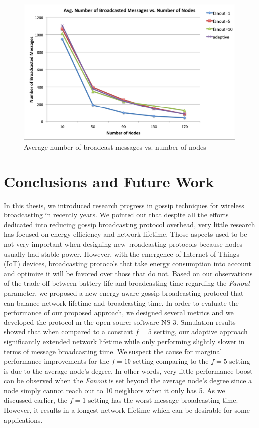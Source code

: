 \documentclass[onehalf,11pt]{beavtex}
\begin{document}
\begin{figure} 
	\centering
	\includegraphics[width=5.5in]{brNum.png}
	\caption{Average number of broadcast messages vs. number of nodes}
	\label{fig:brNum}
\end{figure}

\chapter{Conclusions and Future Work}
\label{Chapter6}

In this thesis, we introduced research progress in gossip techniques for wireless broadcasting in recently years. We pointed out that despite all the efforts dedicated into reducing gossip broadcasting protocol overhead, very little research has focused on energy efficiency and network lifetime. Those aspects used to be not very important when designing new broadcasting protocols because nodes usually had stable power. However, with the emergence of Internet of Things (IoT) devices, broadcasting protocols that take energy consumption into account and optimize it will be favored over those that do not. Based on our observations of the trade off between battery life and broadcasting time regarding the \emph{Fanout} parameter, we proposed a new energy-aware gossip broadcasting protocol that can balance network lifetime and broadcasting time. In order to evaluate the performance of our proposed approach, we designed several metrics and we developed the protocol in the open-source software NS-3. Simulation results showed that when compared to a constant $f=5$ setting, our adaptive approach significantly extended network lifetime while only performing slightly slower in terms of message broadcasting time. We suspect the cause for marginal performance improvements for the $f=10$ setting comparing to the $f=5$ setting is due to the average node's degree. In other words, very little performance boost can be observed when the \emph{Fanout} is set beyond the average node's degree since a node simply cannot reach out to 10 neighbors when it only has 5. As we discussed earlier, the $f=1$ setting has the worst message broadcasting time. However, it results in a longest network lifetime which can be desirable for some applications. 
\end{document}
